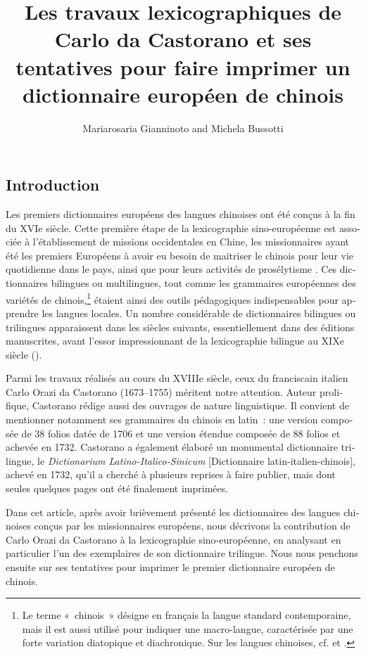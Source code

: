 \documentclass[output=paper,colorlinks,citecolor=brown,arabicfont,chinesefont,booklanguage=french]{langscibook}
\author{Mariarosaria Gianninoto\affiliation{ReSO, Université Paul Valéry-Montpellier 3, France} and
        Michela Bussotti\affiliation{Ecole française d’Extrême-Orient, UMR 8173 (CNRS, EHESS, Université de Paris Cité, France)}}
\title[Les travaux lexicographiques de Carlo da Castorano]
      {Les travaux lexicographiques de Carlo da Castorano et ses tentatives pour faire imprimer un dictionnaire européen de chinois}
\begin{document}
 

\renewcommand{\tabref}[1]{Tableau~\ref{#1}}
\begin{otherlanguage}{french}
\maketitle

\section{Introduction}

Les premiers dictionnaires européens des langues chinoises ont été conçus à la fin du XVIe siècle. Cette première étape de la lexicographie sino-européenne est associée à l’établissement de missions occidentales en Chine, les missionnaires ayant été les premiers Européens à avoir eu besoin de maitriser le chinois pour leur vie quotidienne dans le pays, ainsi que pour leurs activités de prosélytisme \citep{Raini2010, Paternico2013}. Ces dictionnaires bilingues ou multilingues, tout comme les grammaires européennes des variétés de chinois,\footnote{Le terme «~chinois~» désigne en français la langue standard contemporaine, mais il est aussi utilisé pour indiquer une macro-langue, caractérisée par une forte variation diatopique et diachronique. Sur les langues chinoises, cf. \citet{Peyraube2011} et \citet[6--61]{ArcodiaBascian2021}.} étaient ainsi des outils pédagogiques indispensables pour apprendre les langues locales. Un nombre considérable de dictionnaires bilingues ou trilingues apparaissent dans les siècles suivants, essentiellement dans des éditions manuscrites, avant l’essor impressionnant de la lexicographie bilingue au XIXe siècle (\citealt{Yang2014, Kloter2019}).

Parmi les travaux réalisés au cours du XVIIIe siècle, ceux du franciscain italien Carlo Orazi da Castorano (1673--1755) méritent notre attention. Auteur prolifique, Castorano rédige aussi des ouvrages de nature linguistique. Il convient de mentionner notamment ses grammaires du chinois en latin~: une version composée de 38 folios datée de 1706 et une version étendue composée de 88 folios et achevée en 1732. Castorano a également élaboré un monumental dictionnaire trilingue, le \emph{Dictionarium Latino-Italico-Sinicum} [Dictionnaire latin-italien-chinois], achevé en 1732, qu’il a cherché à plusieurs reprises à faire publier, mais dont seules quelques pages ont été finalement imprimées.

Dans cet article, après avoir brièvement présenté les dictionnaires des langues chinoises conçus par les missionnaires européens, nous décrivons la contribution de Carlo Orazi da Castorano à la lexicographie sino-européenne, en analysant en particulier l’un des exemplaires de son dictionnaire trilingue. Nous nous penchons ensuite sur ses tentatives pour imprimer le premier dictionnaire européen de chinois.


\end{otherlanguage}
\end{document}
